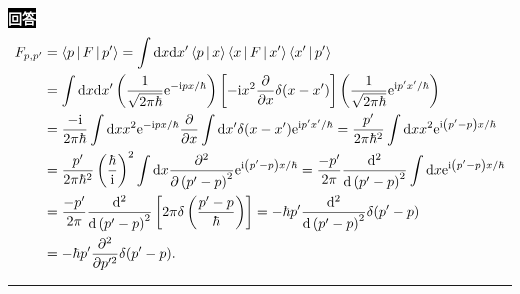\documentclass[11pt,a4paper]{ctexart}
\newenvironment{answer}
  {\par\smallskip\noindent
   \begingroup
   \setlength{\fboxsep}{4pt}%
   \colorbox{black}{\textcolor{white}{\bfseries 回答}}%
   \endgroup
   \quad\ignorespaces}
  {\par\smallskip\noindent\rule{\linewidth}{0.4pt}\medskip}
\begin{document}
\begin{answer}
  \begin{equation}
    \begin{aligned}
      F_{p,p'}
      &=\Braket{p | F | p' }
      =\int \mathrm{d}x\mathrm{d}x' \Braket{p|x } \Braket{x|F|x' } \Braket{x'|p' } \\
      &=\int \mathrm{d}x \mathrm{d}x' \left(\frac{1 }{\sqrt{2\pi \hbar} } \mathrm{e}^{-\mathrm{i}px/\hbar} \right) \left[-\mathrm{i} x^2 \frac{\partial }{\partial x } \delta(x-x') \right] \left(\frac{1 }{\sqrt{2\pi \hbar} } \mathrm{e}^{\mathrm{i} p'x'/\hbar} \right) \\
      &=\frac{-\mathrm{i} }{2\pi \hbar } \int \mathrm{d}x x^2 \mathrm{e}^{-\mathrm{i}px/\hbar} \frac{\partial }{\partial x } \int \mathrm{d}x' \delta(x-x') \mathrm{e}^{\mathrm{i} p'x'/\hbar}
      =\frac{p' }{2\pi \hbar^2 } \int \mathrm{d}x x^2 \mathrm{e}^{\mathrm{i}\left(p'-p \right)x/\hbar} \\
      &=\frac{p' }{2\pi \hbar^2 } \left(\frac{\hbar }{\mathrm{i} }  \right)^2 \int \mathrm{d}x \frac{\partial^2 }{\partial \left(p'-p \right)^2 } \mathrm{e}^{\mathrm{i}\left(p'-p \right)x/\hbar}
      =\frac{-p' }{2\pi } \frac{\mathrm{d}^2 }{\mathrm{d}\left(p'-p \right)^2 } \int \mathrm{d}x \mathrm{e}^{\mathrm{i}\left(p'-p \right)x/\hbar} \\
      &=\frac{-p' }{2\pi } \frac{\mathrm{d}^2 }{\mathrm{d}\left(p'-p \right)^2 } \left[2\pi \delta\left(\frac{p'-p }{\hbar }  \right) \right]
      =-\hbar p' \frac{\mathrm{d}^2 }{\mathrm{d}\left(p'-p \right)^2 } \delta(p'-p) \\
      &=-\hbar p' \frac{\partial^2 }{\partial p'^2 } \delta(p'-p).
    \end{aligned}
  \end{equation}
\end{answer}
\end{document}
